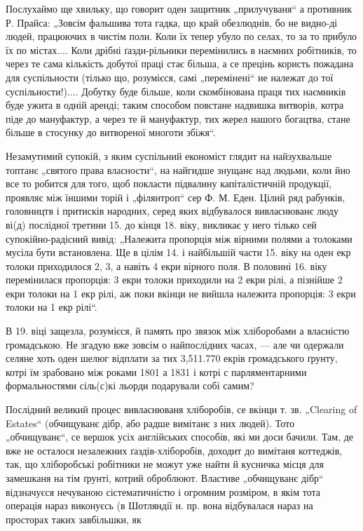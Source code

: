 Послухаймо ще хвильку, що говорит оден защитник „прилучуваня“ а противник Р. Прайса: „Зовсім
фальшива тота гадка, що край обезлюднів, бо не видно-ді людей, працюючих в чистім поли. Коли їх
тепер убуло по селах, то за то прибуло їх по містах.... Коли дрібні ґазди-рільники перемінились в
наємних робітників, то через те сама кількість добутої праці стає більша, а се прецінь користь
пожадана для суспільности (тілько що, розумієся, самі „перемінені“ не належат до тої
суспільности!).... Добутку буде більше, коли скомбінована праця тих наємників буде ужита в одній
аренді; таким способом повстане надвишка витворів, котра піде до мануфактур, а через те й
мануфактур, тих жерел нашого богацтва, стане більше в стосунку до витвореної многоти збіжя“.

Незамутимий супокій, з яким суспільний економіст глядит на найзухвальше топтанє „святого права
власности“, на найгидше знущанє над людьми, коли йно все то робится для того, щоб покласти підвалину
капіталістичній продукції, проявляє між їншими торій і „філянтроп“ сер Ф. М. Еден. Цілий ряд
рабунків, головництв і притисків народних, серед яких відбувалося вивласнюванє люду ві(д) послідної
третини 15. до кінця 18. віку, викликає у него тілько сей супокійно-радісний вивід: „Належита
пропорція між вірними полями а толоками мусіла бути встановлена. Ще в цілім 14. і найбільшій части
15. віку на оден екр толоки приходилося 2, 3, а навіть 4 екри вірного поля. В половині 16. віку
перемінилася пропорція: 3 екри толоки приходили на 2 екри рілі, а пізнійше 2 екри толоки на 1 екр
рілі, аж поки вкінци не вийшла належита пропорція: 3 екри толоки на 1 екр рілі“.

В 19. віці защезла, розумієся, й память про звязок між хліборобами а власністю громадською. Не
згадую вже зовсім о найпослідних часах, — але чи одержали селяне хоть оден шелюг відплати за тих
3,511.770 екрів громадського ґрунту, котрі їм зрабовано між роками 1801 а 1831 і котрі с
парляментарними формальностями сіль(с)кі льорди подарували собі самим?

Послідний великий процес вивласнюваня хліборобів, се вкінци т. зв. „Clearing of Estates“ (обчищуванє
дібр, або радше вимітанє з них людей). Тото „обчищуванє“, се вершок усіх англійських способів, які
ми доси бачили. Там, де вже не осталося незалежних ґаздів-хліборобів, доходит до вимітаня коттеджів,
так, що хліборобські робітники не можут уже найти й кусничка місця для замешканя на тім ґрунті,
котрий оброблюют. Властиве „обчищуванє дібр“ відзначуєся нечуваною сістематичністю і огромним
розміром, в якім тота операція нараз виконуєсь (в Шотляндії н. пр.
вона відбувалася нараз на просторах таких завбільшки, як

